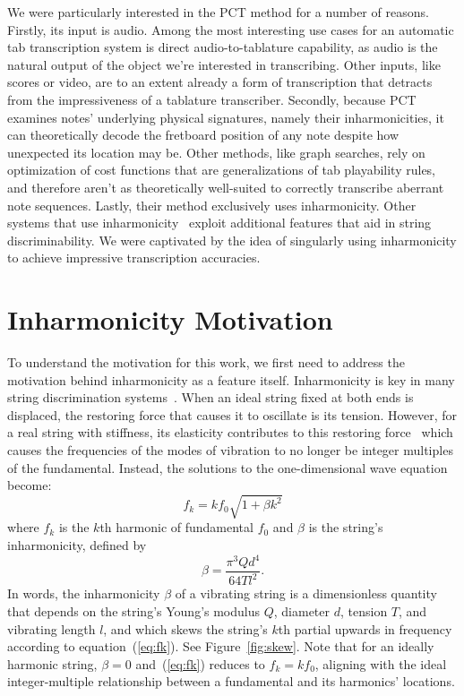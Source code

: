 \documentclass[12pt]{cmuthesis}
\begin{document}
We were particularly interested in the PCT method for a number of reasons. Firstly, its input is audio. Among the most interesting use cases for an automatic tab transcription system is direct audio-to-tablature capability, as audio is the natural output of the object we're interested in transcribing. Other inputs, like scores or video, are to an extent already a form of transcription that detracts from the impressiveness of a tablature transcriber. Secondly, because PCT examines notes' underlying physical signatures, namely their inharmonicities, it can theoretically decode the fretboard position of any note despite how unexpected its location may be. Other methods, like graph searches, rely on optimization of cost functions that are generalizations of tab playability rules, and therefore aren't as theoretically well-suited to correctly transcribe aberrant note sequences. Lastly, their method exclusively uses inharmonicity. Other systems that use inharmonicity~\cite{barbancho2009,abesser2012,dittmar2013,kehling2014} exploit additional features that aid in string discriminability. We were captivated by the idea of singularly using inharmonicity to achieve impressive transcription accuracies.

\section{Inharmonicity Motivation}
To understand the motivation for this work, we first need to address the motivation behind inharmonicity as a feature itself. Inharmonicity is key in many string discrimination systems~\cite{barbancho2009,barbanchoi2012,abesser2012,dittmar2013,kehling2014}. When an ideal string fixed at both ends is displaced, the restoring force that causes it to oscillate is its tension. However, for a real string with stiffness, its elasticity contributes to this restoring force~\cite{fletcher1962} which causes the frequencies of the modes of vibration to no longer be integer multiples of the fundamental. Instead, the solutions to the one-dimensional wave equation become: 
\begin{equation}
\label{eq:fk}
f_k = kf_{0}\sqrt{1+\beta k^2}
\end{equation}
where $f_k$ is the $k$th harmonic of fundamental $f_0$ and $\beta$ is the string's inharmonicity, defined by
\begin{equation}
\beta = \frac{\pi^3 Q d^4}{64 T l^2}. \label{eq:beta}
\end{equation}
In words, the inharmonicity $\beta$ of a vibrating string is a dimensionless quantity that depends on the string's Young's modulus $Q$, diameter $d$, tension $T$, and vibrating length $l$, and which skews the string's $k$th partial upwards in frequency according to equation~(\ref{eq:fk}). See Figure~\ref{fig:skew}. Note that for an ideally harmonic string, $\beta = 0$ and~(\ref{eq:fk}) reduces to $f_k = kf_0$, aligning with the ideal integer-multiple relationship between a fundamental and its harmonics' locations.
\end{document}
